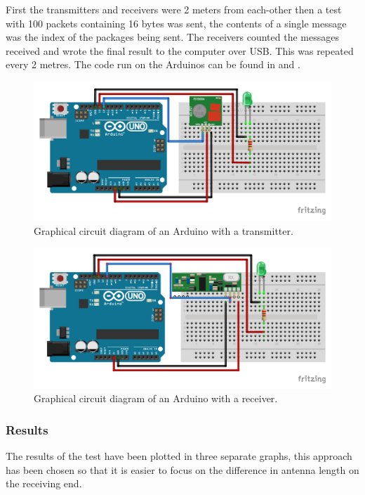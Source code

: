 First the transmitters and receivers were 2 meters from each-other then a test with 100 packets containing 16 bytes was sent, the contents of a single message was the index of the packages being sent. 
The receivers counted the messages received and wrote the final result to the computer over USB. 
This was repeated every 2 metres. 
The code run on the Arduinos can be found in  and .  

\begin{figure}[p]
\centering
\includegraphics[width=\linewidth]{Figures/Fritzing/Transmitter.pdf} 
\caption{Graphical circuit diagram of an Arduino with a transmitter.}
\label{fig:Transmitter}   
\end{figure}

\begin{figure}[p]
\centering
\includegraphics[width=\linewidth]{Figures/Fritzing/Receiver.pdf} 
\caption{Graphical circuit diagram of an Arduino with a receiver.}
\label{fig:Receiver}   
\end{figure}

\subsubsection*{Results}
The results of the test have been plotted in three separate graphs, this approach has been chosen so that it is easier to focus on the difference in antenna length on the receiving end.


